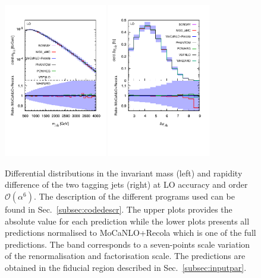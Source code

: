  \begin{figure}[htb!]
   \centering
   \includegraphics[width=0.4\textwidth,angle=0,clip=true,trim={0.4cm 2cm 0.cm 1.cm}]{figures/LO/mjj_LO.pdf}
   \includegraphics[width=0.4\textwidth,angle=0,clip=true,trim={0.4cm 2cm 0.cm 1.cm}]{figures/LO/dyj1j2_LO.pdf}
\caption{\label{fig:wg1_mjj-llLO} Differential distributions in the invariant mass (left) and rapidity difference of the two tagging jets (right) at LO accuracy and order $\mathcal{O}(\alpha^6)$.
The description of the different programs used can be found in Sec.~\ref{subsec:codedescr}.
The upper plots provides the absolute value for each prediction while the lower plots presents all predictions normalised to {\sc MoCaNLO}+{\sc Recola} which is one of the full predictions.
The band corresponds to a seven-points scale variation of the renormalisation and factorisation scale.
The predictions are obtained in the fiducial region described in Sec.~\ref{subsec:inputpar}.}
\end{figure}
